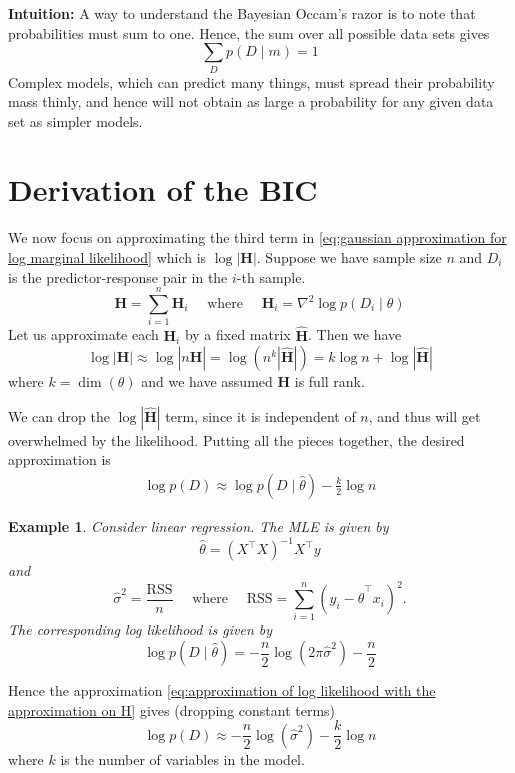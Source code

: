 \documentclass[11pt]{article}
\theoremstyle{plain} %
\newtheorem{example}[theorem]{Example}
\theoremstyle{remark}
\begin{document}
\textbf{Intuition:} A way to understand the Bayesian Occam's razor is to note that
probabilities must sum to one. Hence, the sum over all possible data sets gives
$$
  \sum_{D} p(D \mid m)=1
$$
Complex models, which can predict many things, must spread their
probability mass thinly, and hence will not obtain as large a probability for
any given data set as simpler models.

\section{Derivation of the BIC}
We now focus on approximating the third term in \cref{eq:gaussian approximation for log marginal likelihood} which is $\log
  |\mathbf{H}|$. Suppose we have sample size $n$ and $D_{i}$ is the predictor-response
pair in the $i$-th sample.
$$
  \mathbf{H}=\sum_{i=1}^{n} \mathbf{H}_{i} \quad \text { where } \quad \mathbf{H}_{i}=\nabla^{2} \log p\left(D_{i} \mid \theta\right)
$$
Let us approximate each $\mathbf{H}_{i}$ by a fixed matrix
$\hat{\mathbf{H}}$. Then we have
$$
  \log |\mathbf{H}| \approx \log |n \hat{\mathbf{H}}|=\log \left(n^{k}|\hat{\mathbf{H}}|\right)=k \log n+\log |\hat{\mathbf{H}}|
$$
where $k=\operatorname{dim}(\theta)$ and we have assumed $\mathbf{H}$ is
full rank.

We can drop the $\log |\hat{\mathbf{H}}|$ term, since it is independent of $n$,
and thus will get overwhelmed by the likelihood. Putting all the pieces together, the desired approximation is
\begin{align}
  \log p(D) \approx \log p(D \mid \hat{\theta})-\frac{k}{2} \log n
  \label{eq:approximation of log likelihood with the approximation on H}
\end{align}

\begin{example}
  Consider linear regression. The MLE is given by
  $$
    \hat{\theta}=\left(X^\top X\right)^{-1} X^\top y
  $$
  and
  $$
    \hat{\sigma}^{2}=\frac{\mathrm{RSS}}{n} \quad \text { where } \quad \mathrm{RSS}=\sum_{i=1}^{n}\left(y_{i}-\hat{\theta}^{\top} x_{i}\right)^{2} .
  $$
  The corresponding log likelihood is given by
  $$
    \log p(D \mid \hat{\theta})=-\frac{n}{2} \log \left(2 \pi \hat{\sigma}^{2}\right)-\frac{n}{2}
  $$
\end{example}

Hence the approximation \cref{eq:approximation of log likelihood with the approximation on H} gives (dropping constant terms)
$$
  \log p(D) \approx-\frac{n}{2} \log \left(\hat{\sigma}^{2}\right)-\frac{k}{2} \log n
$$
where $k$ is the number of variables in the model.
\end{document}
